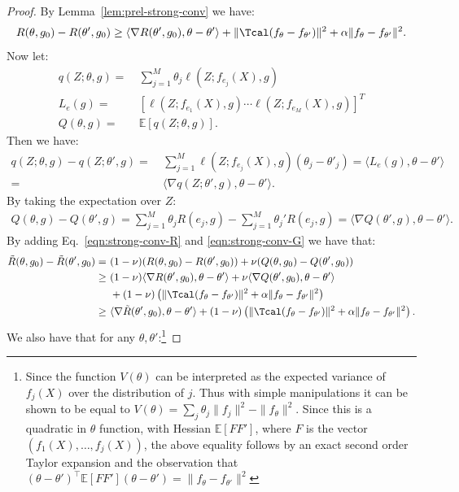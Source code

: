 \documentclass[12pt]{extarticle} %
\begin{document}
\begin{proof}
By Lemma~\ref{lem:prel-strong-conv} we have:
\begin{align}\label{eqn:strong-conv-R}
    R(\theta, g_0)-R(\theta', g_0) \geq \langle \nabla R(\theta', g_0), \theta - \theta' \rangle + \|\Tcal(f_{\theta}-f_{\theta'})\|^2+\alpha\|f_{\theta}-f_{\theta'}\|^2.
\end{align}
Now let: 
\begin{align*}
    q(Z;\theta, g) =~& \sum_{j=1}^{M}\theta_{j} \ell(Z;f_{e_{j}}(X), g)\\
    L_e(g)=~&[\ell(Z;f_{e_{1}}(X),g)\cdots \ell(Z;f_{e_{M}}(X), g)]^{T}\\
    Q(\theta, g) =~& \mathbb{E}\left[q(Z;\theta, g)\right].
\end{align*}
Then we have:
\begin{align*}
    q(Z;\theta, g)-q(Z; \theta', g) =~&\sum_{j=1}^{M}\ell(Z;f_{e_{j}}(X), g)(\theta_{j}-\theta'_{j})
    = \langle{L_{e}(g), \theta-\theta'}\rangle\\
    =~& \langle \nabla q(Z; \theta', g), \theta-\theta' \rangle.
\end{align*}
By taking the expectation over $Z$:
\begin{align}\label{eqn:strong-conv-G}
    Q(\theta, g) - Q(\theta', g) = \sum_{j=1}^{M}\theta_{j}R(e_j, g)-\sum_{j=1}^{M}\theta_{j}'R(e_j, g)=\langle \nabla Q(\theta', g), \theta-\theta' \rangle.
\end{align}
By adding Eq.~\eqref{eqn:strong-conv-R} and \eqref{eqn:strong-conv-G} we have that: 
\begin{align*}
    \tilde{R}(\theta, g_0)-\tilde{R}(\theta', g_0) =~& (1 - \nu) (R(\theta, g_0)-R(\theta', g_0)) + \nu (Q(\theta, g_0) - Q(\theta', g_0))\\
    \geq~& (1-\nu) \langle \nabla R(\theta',g_0), \theta - \theta' \rangle + \nu \langle \nabla Q(\theta',g_0), \theta-\theta' \rangle\\
    ~&+ (1-\nu)\left(\|\Tcal(f_{\theta}-f_{\theta'})\|^2+\alpha\|f_{\theta}-f_{\theta'}\|^2\right) \\
    \geq~& \langle \nabla \tilde{R}(\theta',g_0), \theta - \theta' \rangle+ (1-\nu)\left(\|\Tcal(f_{\theta}-f_{\theta'})\|^2+\alpha\|f_{\theta}-f_{\theta'}\|^2\right) .
\end{align*}
 We also have that for any $\theta, \theta'$:\footnote{Since the function $V(\theta)$ can be interpreted as the expected variance of $f_j(X)$ over the distribution of $j$. Thus with simple manipulations it can be shown to be equal to $V(\theta)=\sum_j \theta_j \|f_j\|^2- \|f_\theta\|^2$. Since this is a quadratic in $\theta$ function, with Hessian $\mathbb{E}[FF']$, where $F$ is the vector $(f_1(X), \ldots, f_j(X))$, the above equality follows by an exact second order Taylor expansion and the observation that $(\theta-\theta')^\top\mathbb{E}[FF'](\theta-\theta') = \|f_\theta - f_{\theta'}\|^2$}

\end{proof}
\end{document}
